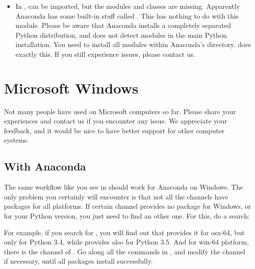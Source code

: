 \documentclass[letterpaper,10pt,english]{sphinxmanual}
\begin{document}
\begin{itemize}
\item {} 
In ,  can be imported, but the modules and classes are
missing. Apparently Anaconda has some built-in stuff called . This
has nothing to do with this module. Please be aware that Anaconda installs a
completely separated Python distribution, and does not detect modules in the
main Python installation. You need to install all modules within Anaconda’s
directory.  does exactly this. If you still
experience issues, please contact us.

\end{itemize}


\section{Microsoft Windows}
\label{\detokenize{installation:microsoft-windows}}
Not many people have used  on Microsoft computers so far. Please share
your experiences and contact us if you encounter any issue. We appreciate
your feedback, and it would be nice to have better support for other computer
systems.


\subsection{With Anaconda}
\label{\detokenize{installation:with-anaconda}}
The same workflow like you see in  should work for
Anaconda on Windows. The only problem you certainly will encounter is that not
all the channels have packages for all platforms. If certain channel provides
no package for Windows, or for your Python version, you just need to find an
other one. For this, do a search:

%
\begin{sphinxVerbatim}[commandchars=\\\{\}]
     
\end{sphinxVerbatim}

For example, if you search for , you will find out that 
provides it for osx-64, but only for Python 3.4, while  provides
also for Python 3.5. And for win-64 platform, there is the channel of
. Go along all the commands in , and
modify the channel if necessary, until all packages install successfully.
\end{document}
